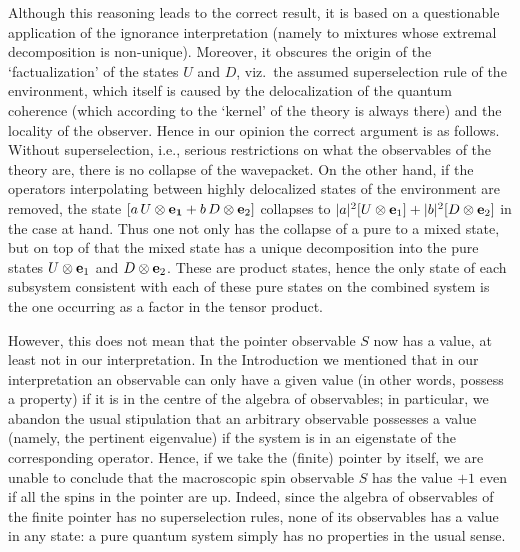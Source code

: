 \documentclass[12pt,titlepage]{article}
\newcommand{\ot}{\otimes}
\begin{document}
Although this reasoning leads to the correct result, it is based on a
questionable application of
the ignorance interpretation (namely to mixtures whose extremal decomposition
is non-unique).
 Moreover,
it obscures the origin of the `factualization' of the states $U$ and $D$, viz.\
the assumed
superselection rule of the environment, which itself is caused by the
delocalization of the quantum
coherence (which according to the `kernel' of the theory is always there) and
the locality of the
observer.  Hence in our opinion the correct argument is as follows. Without
superselection,
i.e., serious restrictions on what the observables of the theory are, there is
no collapse of the
wavepacket.    On the other hand, if the operators interpolating
between highly delocalized states of the environment are removed,
the state $[a\, U\ot {\bf e_1}+ b\, D\ot {\bf e}_2]$ collapses to
$|a|^2 [U\ot {\bf e}_1]+|b|^2 [D\ot {\bf e}_2]$ in the case at hand. Thus one
not only has
the collapse of a pure to a mixed state, but on top of that the mixed state has
a unique decomposition
into the pure states $U\ot {\bf e}_1$ and $D\ot {\bf e}_2$. These are product
states, hence the only
state of each subsystem consistent with each of these pure states on the
combined system is the one
occurring as a factor in the tensor product.

However, this does not mean that the pointer observable $S$ now has a value, at
least not in our
interpretation. In the Introduction we mentioned that in our interpretation an
observable can only
have a given value (in other words, possess a property) if it is in the centre
of the algebra of
observables; in particular, we abandon the usual stipulation that an arbitrary
observable possesses a
value (namely, the pertinent eigenvalue) if the system is in an eigenstate of
the corresponding
operator. Hence, if we take the (finite) pointer by  itself, we are unable to
conclude that the
macroscopic spin observable $S$ has the value $+1$ even if all the spins in the
pointer are up.
Indeed, since the algebra of observables of the  finite pointer has no
superselection rules, none of
its observables has a value in any state: a pure quantum system simply has no
properties in the usual
sense.
\end{document}
